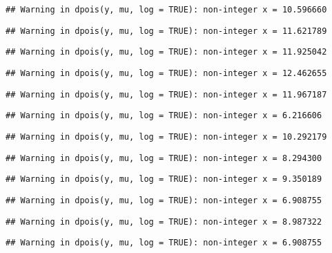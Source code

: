 \documentclass[
]{article}
\begin{document}
\begin{verbatim}
## Warning in dpois(y, mu, log = TRUE): non-integer x = 10.596660
\end{verbatim}

\begin{verbatim}
## Warning in dpois(y, mu, log = TRUE): non-integer x = 11.621789
\end{verbatim}

\begin{verbatim}
## Warning in dpois(y, mu, log = TRUE): non-integer x = 11.925042
\end{verbatim}

\begin{verbatim}
## Warning in dpois(y, mu, log = TRUE): non-integer x = 12.462655
\end{verbatim}

\begin{verbatim}
## Warning in dpois(y, mu, log = TRUE): non-integer x = 11.967187
\end{verbatim}

\begin{verbatim}
## Warning in dpois(y, mu, log = TRUE): non-integer x = 6.216606
\end{verbatim}

\begin{verbatim}
## Warning in dpois(y, mu, log = TRUE): non-integer x = 10.292179
\end{verbatim}

\begin{verbatim}
## Warning in dpois(y, mu, log = TRUE): non-integer x = 8.294300
\end{verbatim}

\begin{verbatim}
## Warning in dpois(y, mu, log = TRUE): non-integer x = 9.350189
\end{verbatim}

\begin{verbatim}
## Warning in dpois(y, mu, log = TRUE): non-integer x = 6.908755
\end{verbatim}

\begin{verbatim}
## Warning in dpois(y, mu, log = TRUE): non-integer x = 8.987322
\end{verbatim}

\begin{verbatim}
## Warning in dpois(y, mu, log = TRUE): non-integer x = 6.908755
\end{verbatim}
\end{document}
